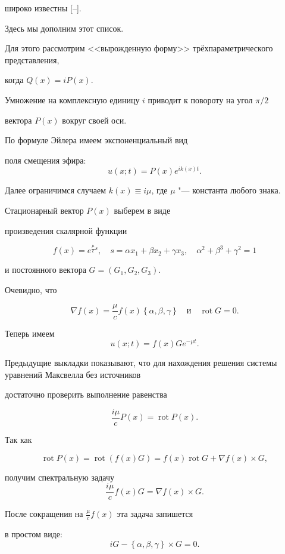 широко известны [--]. 



Здесь мы дополним этот список. 

Для этого рассмотрим <<вырожденную форму>> трёхпараметрического представления, 

когда $Q(x) = iP(x)$.

Умножение на комплексную единицу $i$ приводит к повороту на угол $\pi/2$ 

вектора $P(x)$ вокруг своей оси. 

По формуле Эйлера имеем экспоненциальный вид 

поля смещения эфира: $$\displaystyle u(x;t) = P(x)e^{ik(x)t}.$$ 



Далее ограничимся случаем $k(x)\equiv i\mu$, где $\mu$ "--- константа любого знака.

Стационарный вектор $P(x)$ выберем в виде 

произведения скалярной функции 

$$\displaystyle f(x) = e^{\frac{\mu}{c}s},\quad 

s = \alpha x_1 + \beta x_2 + \gamma x_3,\quad \alpha^2 + \beta^3 + \gamma^2 = 1$$

и постоянного вектора $G =  (G_1, G_2, G_3 )$. 

Очевидно, что 

$$\nabla f(x) = \frac{\mu}{c}f(x)\left\{\alpha,\beta,\gamma\right\}\quad \text{и}\quad \mathop{\mathrm{rot}} G = 0.$$ 



Теперь имеем $$\displaystyle u(x;t) = f(x)Ge^{-\mu t}.$$  

Предыдущие выкладки показывают, что для нахождения решения системы уравнений Максвелла без источников 

достаточно проверить выполнение равенства 

$$\displaystyle \frac{i\mu}{c}P(x) = \mathop{\mathrm{rot}} P(x).$$  

Так как 

$$\mathop{\mathrm{rot}} P(x) = \mathop{\mathrm{rot}} (f(x)G) = f(x)\mathop{\mathrm{rot}} G + \nabla f(x)\times G,$$ 

получим спектральную задачу $$\displaystyle \frac{i\mu}{c}f(x) G = \nabla f(x)\times G.$$

После сокращения на $\displaystyle \frac{\mu}{c}f(x)$  эта задача запишется 

в простом виде: $$iG - \left\{\alpha,\beta,\gamma\right\}\times G = 0.$$



